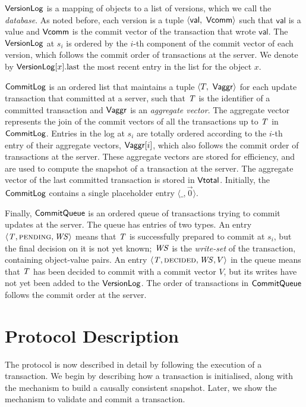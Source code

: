 $\mathsf{VersionLog}$ is a mapping of objects to a list of versions, which we call the \emph{database}. As noted before, each version is a tuple $\langle \mathsf{val},\ \mathsf{Vcomm} \rangle$ such that $\mathsf{val}$ is a value and $\mathsf{Vcomm}$ is the commit vector of the transaction that wrote $\mathsf{val}$. The $\mathsf{VersionLog}$ at $s_i$ is ordered by the $i$-th component of the commit vector of each version, which follows the commit order of transactions at the server. We denote by $\mathsf{VersionLog}[x].{\rm last}$ the most recent entry in the list for the object $x$.

$\mathsf{CommitLog}$ is an ordered list that maintains a tuple $\langle T,\ \mathsf{Vaggr} \rangle$ for each update transaction that committed at a server, such that $\mathit{T}$ is the identifier of a committed transaction and $\mathsf{Vaggr}$ is an \emph{aggregate vector}. The aggregate vector represents the join of the commit vectors of all the transactions up to $\mathit{T}$ in $\mathsf{CommitLog}$. Entries in the log at $s_i$ are totally ordered according to the $i$-th entry of their aggregate vectors, $\mathsf{Vaggr}[i]$, which also follows the commit order of transactions at the server. These aggregate vectors are stored for efficiency, and are used to compute the snapshot of a transaction at the server. The aggregate vector of the last committed transaction is stored in $\mathsf{Vtotal}$. Initially, the $\mathsf{CommitLog}$ contains a single placeholder entry $\langle \_, \vec{0} \rangle$.

Finally, $\mathsf{CommitQueue}$ is an ordered queue of transactions trying to commit updates at the server. The queue has entries of two types. An entry $\langle \mathit{T}, \text{\sc pending}, \mathit{WS} \rangle$ means that $\mathit{T}$ is successfully prepared to commit at $s_i$, but the final decision on it is not yet known; $\mathit{WS}$ is the \emph{write-set} of the transaction, containing object-value pairs. An entry $\langle \mathit{T}, \text{\sc decided}, \mathit{WS}, V \rangle$ in the queue means that $\mathit{T}$ has been decided to commit with a commit vector $V$, but its writes have not yet been added to the $\mathsf{VersionLog}$. The order of transactions in $\mathsf{CommitQueue}$ follows the commit order at the server.

\section{Protocol Description}

The protocol is now described in detail by following the execution of a transaction. We begin by describing how a transaction is initialised, along with the mechanism to build a causally consistent snapshot. Later, we show the mechanism to validate and commit a transaction.

